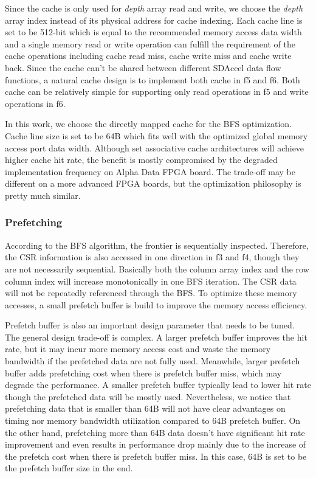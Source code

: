 Since the cache is only used for \textit{depth} array read and write, we  
choose the \textit{depth} array index instead of its physical address for cache 
indexing. Each cache line is set to be 512-bit which is equal to the recommended 
memory access data width and a single memory read or write operation can 
fulfill the requirement of the cache operations including cache read miss, 
cache write miss and cache write back. Since the cache can't be shared 
between different SDAccel data flow functions, a natural cache design is 
to implement both cache in f5 and f6. Both cache can be relatively simple 
for supporting only read operations in f5 and write operations in f6.  

In this work, we choose the directly mapped cache for the BFS optimization. 
Cache line size is set to be 64B which fits well with the optimized global memory 
access port data width.
Although set associative cache architectures will achieve higher 
cache hit rate, the benefit is mostly compromised by the degraded 
implementation frequency on Alpha Data FPGA board. The trade-off 
may be different on a more advanced FPGA boards, but the optimization 
philosophy is pretty much similar. 
 
\subsubsection{Prefetching}
According to the BFS algorithm, the frontier is sequentially inspected. 
Therefore, the CSR information is also accessed in one direction 
in f3 and f4, though they are not necessarily sequential. Basically 
both the column array index and the row column index will increase 
monotonically in one BFS iteration. The CSR data will not be repeatedly 
referenced through the BFS. To optimize these memory 
accesses, a small prefetch buffer 
is build to improve the memory access efficiency. 

Prefetch buffer is also an important design parameter that needs to be tuned.
The general design trade-off is complex.
A larger prefetch buffer improves the hit rate, but it may incur more memory 
access cost and waste the memory bandwidth if the prefetched data are 
not fully used. Meanwhile, larger prefetch buffer adds prefetching cost 
when there is prefetch buffer miss, which may degrade the performance. 
A smaller prefetch buffer typically lead to lower hit rate though 
the prefetched data will be mostly used. Nevertheless, we notice that 
prefetching data that is smaller than 64B will not have clear advantages on timing 
nor memory bandwidth utilization compared to 64B prefetch buffer. 
On the other hand, prefetching more than 64B data doesn't have 
significant hit rate improvement and even results in 
performance drop mainly due to the increase of the prefetch cost when there 
is prefetch buffer miss. In this case, 64B is set to be the prefetch buffer size 
in the end.

